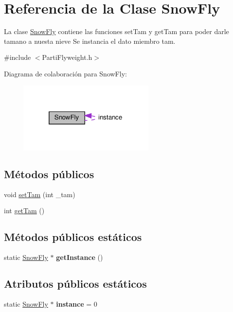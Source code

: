 \hypertarget{classSnowFly}{}\section{Referencia de la Clase Snow\+Fly}
\label{classSnowFly}


La clase \hyperlink{classSnowFly}{Snow\+Fly} contiene las funciones set\+Tam y get\+Tam para poder darle tamano a nuesta nieve  Se instancia el dato miembro tam.  




{\ttfamily \#include $<$Parti\+Flyweight.\+h$>$}



Diagrama de colaboración para Snow\+Fly\+:\nopagebreak
\begin{figure}[H]
\begin{center}
\leavevmode
\includegraphics[width=193pt]{classSnowFly__coll__graph}
\end{center}
\end{figure}
\subsection*{Métodos públicos}
\begin{DoxyCompactItemize}
\item 
void \hyperlink{classSnowFly_a1068f2ce770daa2932732ec6c94715a9}{set\+Tam} (int \+\_\+tam)
\item 
int \hyperlink{classSnowFly_a6677ebdc7b0cb9bb7ea1b90292b18ef2}{get\+Tam} ()
\end{DoxyCompactItemize}
\subsection*{Métodos públicos estáticos}
\begin{DoxyCompactItemize}
\item 
\mbox{\label{classSnowFly_a2a1b39f6b9f85311222e82e68d131650}} 
static \hyperlink{classSnowFly}{Snow\+Fly} $\ast$ {\bfseries get\+Instance} ()
\end{DoxyCompactItemize}
\subsection*{Atributos públicos estáticos}
\begin{DoxyCompactItemize}
\item 
\mbox{\label{classSnowFly_a7d6143f2d7e5fb5650afca3f6436f208}} 
static \hyperlink{classSnowFly}{Snow\+Fly} $\ast$ {\bfseries instance} = 0
\end{DoxyCompactItemize}



